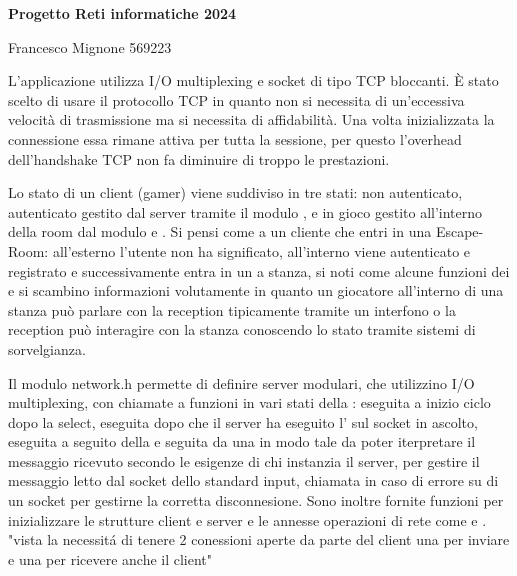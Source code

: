 \documentclass[12pt]{article}
\begin{document}
\begin{center}
    \Large
    \textbf{Progetto Reti informatiche 2024}
    
    \large
    Francesco Mignone 569223
\end{center}
L’applicazione utilizza I/O multiplexing e socket di tipo TCP bloccanti. È stato scelto di usare il protocollo TCP in quanto non si necessita di un’eccessiva velocità di trasmissione ma si necessita di affidabilità. Una volta inizializzata la connessione essa rimane attiva per tutta la sessione, per questo l'overhead dell'handshake TCP non fa diminuire di troppo le prestazioni.

Lo stato di un client (gamer) viene suddiviso in tre stati: non autenticato, autenticato gestito dal server tramite il modulo , e in gioco gestito all'interno della room dal modulo  e . Si pensi come a un cliente che entri in una Escape-Room: all'esterno l'utente non ha significato, all'interno viene autenticato e registrato e successivamente entra in un a stanza, si noti come alcune funzioni dei  e  si scambino informazioni volutamente in quanto un giocatore all'interno di una stanza può parlare con la reception tipicamente tramite un interfono o la reception può interagire con la stanza conoscendo lo stato tramite sistemi di sorvelgianza.

\vspace{0.1in}

Il modulo network.h permette di definire server modulari, che utilizzino I/O multiplexing, con chiamate a funzioni in vari stati della  :  eseguita a inizio ciclo dopo la select,  eseguita dopo che il server ha eseguito l' sul socket in ascolto,  eseguita a seguito della  e seguita da una  in modo tale da poter iterpretare il messaggio ricevuto secondo le esigenze di chi instanzia il server,  per gestire il messaggio letto dal socket dello standard input,  chiamata in caso di errore su di un socket per gestirne la corretta disconnesione. Sono inoltre fornite funzioni per inizializzare le strutture client e server e le annesse operazioni di rete come  e . "vista la necessitá di tenere 2 conessioni aperte da parte del client una per inviare e una per ricevere anche il client"
\end{document}
